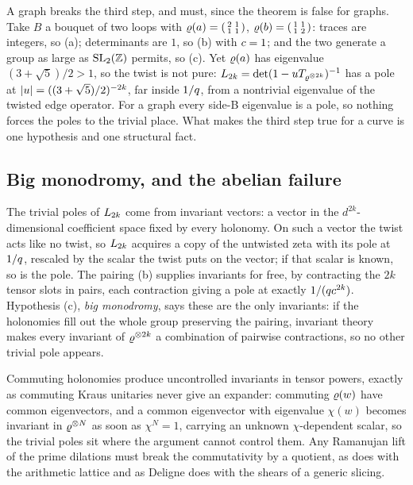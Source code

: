 A graph breaks the third step, and must, since the theorem is false for graphs. Take $B$ a bouquet of
two loops with $\varrho(a) = \left(\begin{smallmatrix}2&1\\1&1\end{smallmatrix}\right)$, $\varrho(b) =
\left(\begin{smallmatrix}1&1\\1&2\end{smallmatrix}\right)$: traces are integers, so (a); determinants
are $1$, so (b) with $c=1$; and the two generate a group as large as $\mathrm{SL}_2(\mathbb Z)$ permits, so
(c). Yet $\varrho(a)$ has eigenvalue $(3+\sqrt5)/2 > 1$, so the twist is not pure: $L_{2k} =
\det(1-uT_{\varrho^{\otimes2k}})^{-1}$ has a pole at $|u| = ((3+\sqrt5)/2)^{-2k}$, far inside $1/q$,
from a nontrivial eigenvalue of the twisted edge operator. For a graph every side-B eigenvalue is a pole, so
nothing forces the poles to the trivial place. What makes the third step true for a curve is one hypothesis
and one structural fact.

\subsection{Big monodromy, and the abelian failure}

The trivial poles of $L_{2k}$ come from invariant vectors: a vector in the $d^{2k}$-dimensional
coefficient space fixed by every holonomy. On such a vector the twist acts like no twist, so $L_{2k}$
acquires a copy of the untwisted zeta with its pole at $1/q$, rescaled by the scalar the twist puts on the
vector; if that scalar is known, so is the pole. The pairing (b) supplies invariants for free, by
contracting the $2k$ tensor slots in pairs, each contraction giving a pole at exactly
$1/(qc^{2k})$. Hypothesis (c), \emph{big monodromy}, says these are the only invariants: if the
holonomies fill out the whole group preserving the pairing, invariant theory makes every invariant of
$\varrho^{\otimes2k}$ a combination of pairwise contractions, so no other trivial pole appears.

\begin{observation}
\label{obs:abelian-obstruction}
Commuting holonomies produce uncontrolled invariants in tensor powers, exactly as commuting Kraus unitaries
never give an expander: commuting $\varrho(w)$ have common eigenvectors, and a common eigenvector with
eigenvalue $\chi(w)$ becomes invariant in $\varrho^{\otimes N}$ as soon as $\chi^N = 1$, carrying an unknown
$\chi$-dependent scalar, so the trivial poles sit where the argument cannot control them. Any Ramanujan lift
of the prime dilations must break the commutativity by a quotient, as \cite{lubotzky1988ramanujan} does with
the arithmetic lattice and as Deligne does with the shears of a generic slicing.
\end{observation}

